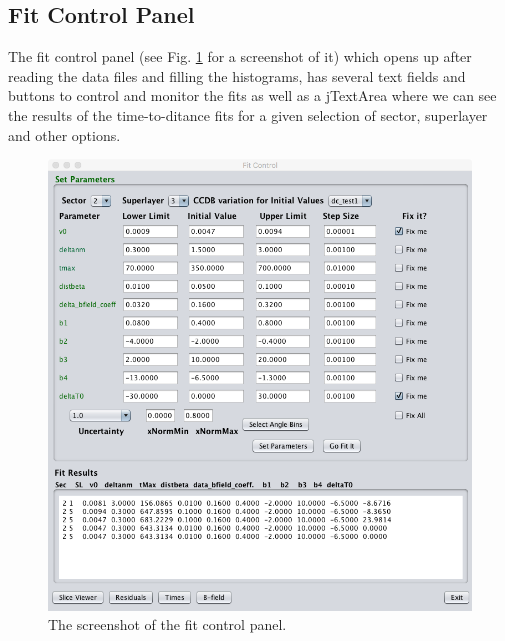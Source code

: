 \documentclass[12pt,epsfig]{article}
\begin{document}
\subsection{Fit Control Panel}
\label{ssFitControlPanel}

The fit control panel (see Fig. \ref{fFitControlPanel} for a screenshot of it) which opens up after reading the data files and filling the histograms, has several text fields and buttons to control and monitor the fits as well as a jTextArea where we can see the results of the time-to-ditance fits for a given selection of sector, superlayer and other options. 


\begin{figure} [H] %
    \centering
    \includegraphics[width=1.0\textwidth]{Figures/Screenshots/screenshotFitControlPanelDCcalibSuite.png}
    \caption{The screenshot of the fit control panel.}
    \label{fFitControlPanel}
\end{figure}
\end{document}
